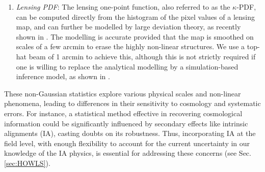 \begin{enumerate}
   Peak count statistics are amongst the most widely used non-Gaussian lensing statistics, as it is simple to measure yet highly sensitive to non-Gaussian structures.
    Although some theoretical models have been developed to describe the largest peaks \citep[see][]{Shan18, HSCY1_Peaks_th}, we report here the results on a much wider range of statistics, which can only be accurately modelled from numerical simulations themselves.
    \item \textit{Lensing PDF}: The lensing one-point function, also referred to as the $\kappa$-PDF, can be computed directly from the histogram of the pixel values of a lensing map, and can further be modelled by large deviation theory, as recently shown in  \citet{LensingPDF}. The modelling is accurate provided that the map is smoothed on scales of a few arcmin to erase the highly non-linear structures. We use a top-hat beam of  1 arcmin to achieve this, although this is not strictly required if one is willing to replace the analytical modelling by a simulation-based inference model, as shown in \citet{Giblin_PDF}. 
\end{enumerate}

These non-Gaussian statistics explore various physical scales and non-linear phenomena, leading to differences in their sensitivity to cosmology and systematic errors.
For instance, a statistical method effective in recovering cosmological information could be significantly influenced by secondary effects like intrinsic alignments (IA), casting doubts on its robustness.
Thus, incorporating IA  at the field level, with enough flexibility to account for the current uncertainty in our knowledge of the IA physics,  is essential for addressing these concerns (see Sec. \ref{sec:HOWLS}). 

